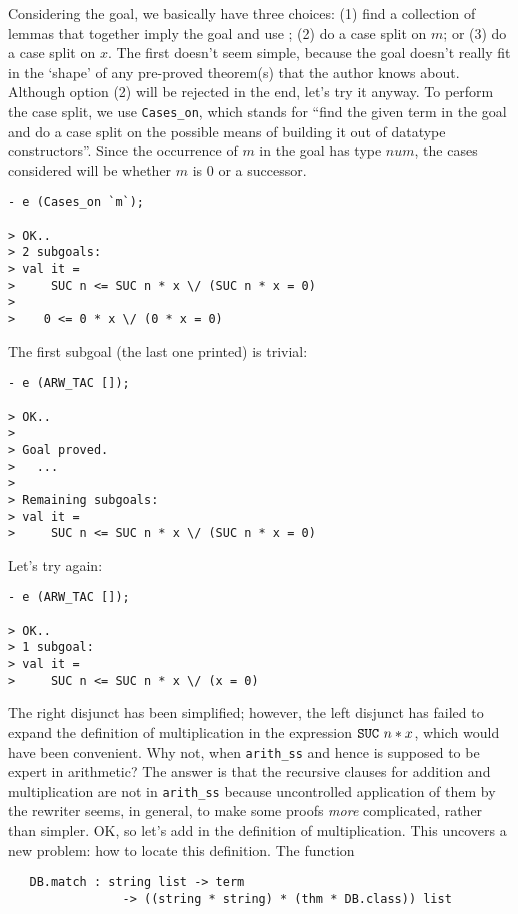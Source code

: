 Considering the goal, we basically have three choices: (1) find a
collection of lemmas that together imply the goal and use
; (2) do a case split on $m$; or (3) do a case split on
$x$. The first doesn't seem simple, because the goal doesn't really fit
in the `shape' of any pre-proved theorem(s) that the author knows
about. Although option (2) will be rejected in the end, let's try it
anyway. To perform the case split, we use \verb+Cases_on+, which stands
for ``find the given term in the goal and do a case split on the
possible means of building it out of datatype constructors''. Since the
occurrence of $m$ in the goal has type $num$, the cases considered will
be whether $m$ is $0$ or a successor.
\begin{session}\begin{verbatim}
- e (Cases_on `m`);

> OK..
> 2 subgoals:
> val it =
>     SUC n <= SUC n * x \/ (SUC n * x = 0)
>
>    0 <= 0 * x \/ (0 * x = 0)
\end{verbatim}\end{session}
\noindent The first subgoal (the last one printed) is trivial:

\begin{session}\begin{verbatim}
- e (ARW_TAC []);

> OK..
>
> Goal proved.
>   ...
>
> Remaining subgoals:
> val it =
>     SUC n <= SUC n * x \/ (SUC n * x = 0)
\end{verbatim}\end{session}
\noindent Let's try  again:
\begin{session}\begin{verbatim}
- e (ARW_TAC []);

> OK..
> 1 subgoal:
> val it =
>     SUC n <= SUC n * x \/ (x = 0)
\end{verbatim}\end{session}
The right disjunct has been simplified; however, the left disjunct has
failed to expand the definition of multiplication in the expression
$\mbox{\tt SUC}\ n * x$, which would have been convenient. Why not, when
\verb+arith_ss+ and hence  is supposed to be expert in
arithmetic? The answer is that the recursive clauses for addition and
multiplication are not in \verb+arith_ss+ because uncontrolled
application of them by the rewriter seems, in general, to make some
proofs \emph{more} complicated, rather than simpler. OK, so let's
add in the definition of multiplication. This uncovers a new problem: how
to locate this definition. The function
\begin{boxed}\begin{verbatim}
   DB.match : string list -> term
                -> ((string * string) * (thm * DB.class)) list
\end{verbatim}\end{boxed}

